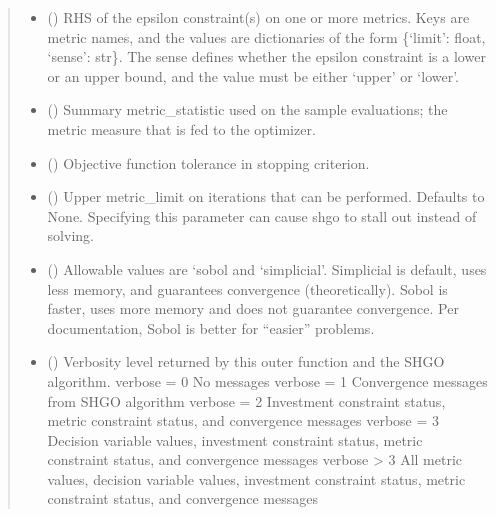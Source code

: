 \documentclass[letterpaper,10pt,english]{sphinxmanual}
\begin{document}
\begin{fulllineitems}
\begin{fulllineitems}
\begin{quote}
\begin{description}
\begin{itemize}
\item {} 
 () \textendash{} RHS of the epsilon constraint(s) on one or more metrics. Keys are metric
names, and the values are dictionaries of the form
\{‘limit’: float, ‘sense’: str\}. The sense defines whether the epsilon
constraint is a lower or an upper bound, and the value must be either
‘upper’ or ‘lower’.

\item {} 
 () \textendash{} Summary metric\_statistic used on the sample evaluations; the metric
measure that is fed to the optimizer.

\item {} 
 () \textendash{} Objective function tolerance in stopping criterion.

\item {} 
 () \textendash{} Upper metric\_limit on iterations that can be performed. Defaults to None.
Specifying this parameter can cause shgo to stall out instead of solving.

\item {} 
 () \textendash{} Allowable values are ‘sobol and ‘simplicial’. Simplicial is default, uses
less memory, and guarantees convergence (theoretically). Sobol is faster,
uses more memory and does not guarantee convergence. Per documentation,
Sobol is better for “easier” problems.

\item {} 
 () \textendash{} Verbosity level returned by this outer function and the SHGO algorithm.
verbose = 0     No messages
verbose = 1     Convergence messages from SHGO algorithm
verbose = 2     Investment constraint status, metric constraint status,
and convergence messages
verbose = 3     Decision variable values, investment constraint status,
metric constraint status, and convergence messages
verbose \textgreater{} 3     All metric values, decision variable values, investment
constraint status, metric constraint status, and
convergence messages


\end{itemize}
\end{description}
\end{quote}
\end{fulllineitems}
\end{fulllineitems}
\end{document}
